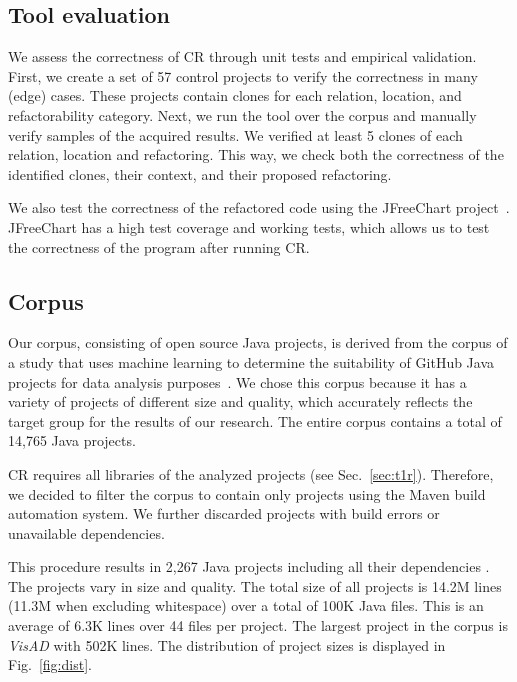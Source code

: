 \documentclass[sigconf,review,anonymous]{acmart}
\begin{document}
\subsection{Tool evaluation}
We assess the correctness of CR through unit tests and empirical validation. First, we create a set of 57 control projects to verify the correctness in many (edge) cases. These projects contain clones for each relation, location, and refactorability category. 
Next, we run the tool over the corpus and manually verify samples of the acquired results. We verified at least 5 clones of each relation, location and refactoring. This way, we check both the correctness of the identified clones, their context, and their proposed refactoring.

We also test the correctness of the refactored code using the JFreeChart project~\cite{gilbert2002jfreechart}. JFreeChart has a high test coverage and working tests, which allows us to test the correctness of the program after running CR.



\subsection{Corpus}
Our corpus, consisting of open source Java projects, is derived from the corpus of a study that uses machine learning to determine the suitability of GitHub Java projects for data analysis purposes~\cite{githubCorpus2013}. We chose this corpus because it has a variety of projects of different size and quality, which accurately reflects the target group for the results of our research. The entire corpus contains a total of 14,765 Java projects.

CR requires all libraries of the analyzed projects
(see Sec.~\ref{sec:t1r}). Therefore, we decided to filter the corpus to contain only projects using the Maven build automation system. We further discarded projects with build errors or unavailable dependencies. %

This procedure results in 2,267 Java projects including all their dependencies%
. The projects vary in size and quality. The total size of all projects is 14.2M lines (11.3M when excluding whitespace) over a total of 100K Java files. This is an average of 6.3K lines over 44 files per project. The largest project in the corpus is \textit{VisAD} with 502K lines. The distribution of project sizes is displayed in Fig.~\ref{fig:dist}.
\end{document}

